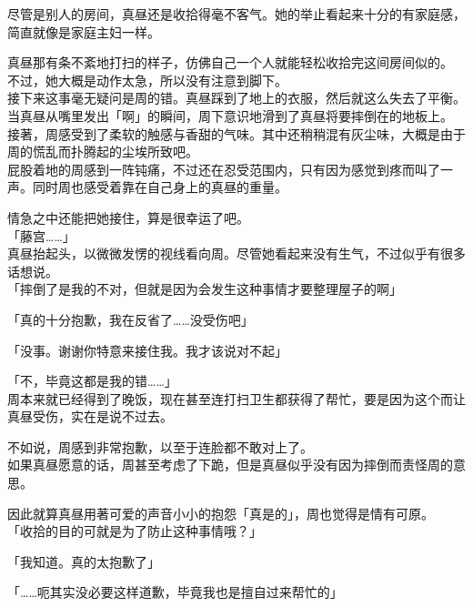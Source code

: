 尽管是别人的房间，真昼还是收拾得毫不客气。她的举止看起来十分的有家庭感，简直就像是家庭主妇一样。%

真昼那有条不紊地打扫的样子，仿佛自己一个人就能轻松收拾完这间房间似的。\\

不过，她大概是动作太急，所以没有注意到脚下。\\

接下来这事毫无疑问是周的错。真昼踩到了地上的衣服，然后就这么失去了平衡。\\

当真昼从嘴里发出「啊」的瞬间，周下意识地滑到了真昼将要摔倒在的地板上。\\

接著，周感受到了柔软的触感与香甜的气味。其中还稍稍混有灰尘味，大概是由于周的慌乱而扑腾起的尘埃所致吧。\\

屁股着地的周感到一阵钝痛，不过还在忍受范围内，只有因为感觉到疼而叫了一声。同时周也感受着靠在自己身上的真昼的重量。

情急之中还能把她接住，算是很幸运了吧。\\

「藤宫……」\\

真昼抬起头，以微微发愣的视线看向周。尽管她看起来没有生气，不过似乎有很多话想说。\\

「摔倒了是我的不对，但就是因为会发生这种事情才要整理屋子的啊」

「真的十分抱歉，我在反省了……没受伤吧」

「没事。谢谢你特意来接住我。我才该说对不起」

「不，毕竟这都是我的错……」\\

周本来就已经得到了晚饭，现在甚至连打扫卫生都获得了帮忙，要是因为这个而让真昼受伤，实在是说不过去。

不如说，周感到非常抱歉，以至于连脸都不敢对上了。\\

如果真昼愿意的话，周甚至考虑了下跪，但是真昼似乎没有因为摔倒而责怪周的意思。

因此就算真昼用著可爱的声音小小的抱怨「真是的」，周也觉得是情有可原。\\

「收拾的目的可就是为了防止这种事情哦？」

「我知道。真的太抱歉了」

「……呃其实没必要这样道歉，毕竟我也是擅自过来帮忙的」\\

